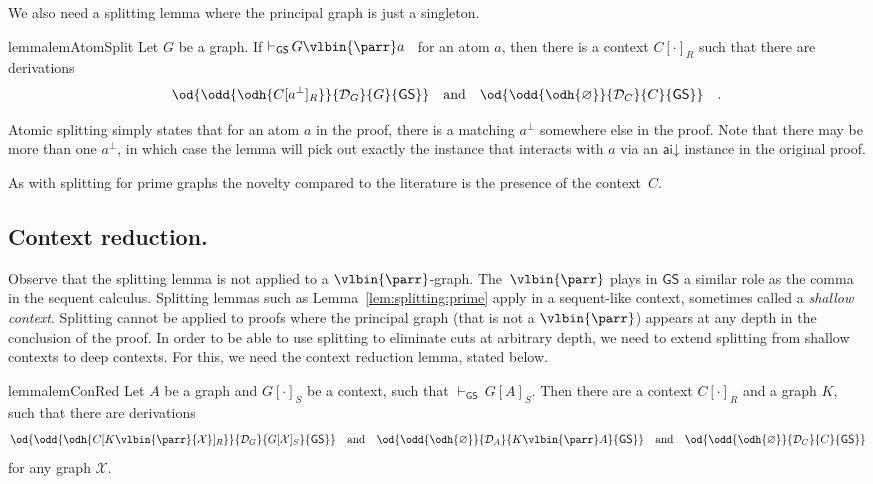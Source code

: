\documentclass{lmcs} %
\newcommand{\proves}[2][]{\mathord{\vdash_{#1}\,}{#2}}
\renewcommand{\emptyset}{\varnothing}
\def\unit{\emptyset}
\def\GS{\mathsf{GS}}
\newcommand{\coons}[2]{[#1]_{#2}}														%
\newcommand{\coonso}[1]{[\cdot]_{#1}}
\newcommand{\quand}{\quad\mbox{and}\quad}
\newcommand{\quadfs}{\rlap{\quad.}}
\def\aidr{\dairule}
\def\ods#1#2#3#4{\od{\odd{\odh{#1}}{#2}{#3}{#4}}}
\def\cneg#1{{#1^\bot}}
\def\lpar{\vlbin{\parr}}
\def\airule{\mathsf{ai}}
\def\dairule{\airule\mathord{\downarrow}}
\def\gA{A}
\def\gC{C}
\def\gG{G}
\def\gK{K}
\newcommand{\dD}{\mathcal{D}}
\theoremstyle{plain}
\begin{document}
We also need a splitting lemma where the principal graph is just a singleton.

\begin{restatable}{lemma}{lemAtomSplit}\label{lem:splitting:atom}
	Let $\gG$ be a graph.
	If\/ $\proves[\GS]{G\lpar a}$~ for an atom $a$, then there is a context $\gC\coonso R$ such that 
 there are derivations
	\begin{equation*}
		\ods{\gC\coons{\cneg a}R}{\dD_G}{\gG}{\GS}
		\quand
		\ods{\unit}{\dD_C}{\gC}{\GS}
		\quadfs
	\end{equation*}
\end{restatable}
Atomic splitting simply states that for an atom $a$ in the proof, there is a matching $\cneg{a}$ somewhere else in the proof. Note that there may be more than one $\cneg{a}$, in which case the lemma will pick out exactly the instance that interacts with $a$ via an $\aidr$ instance in the original proof.

As with splitting for prime graphs the novelty compared to the literature is the presence of the context~$C$.






\subsection*{Context reduction.}
Observe that the splitting lemma is not applied to a $\lpar$-graph. The~$\lpar$ plays in $\GS$ a similar role as the comma in the sequent calculus.
Splitting lemmas such as Lemma~\ref{lem:splitting:prime} apply in a sequent-like 
context, sometimes called a \textit{shallow context}. Splitting cannot be applied to proofs where the principal graph (that is not a $\lpar$) appears at any depth in the conclusion of the proof. In order to be able to use splitting to eliminate cuts at arbitrary depth, we need to extend splitting from shallow contexts to deep contexts. For this, we need the context reduction lemma, stated below.





\def\XXX{{\mathcal X}}
\def\YYY{{\mathcal Y}}
\begin{restatable}{lemma}{lemConRed}\label{lem:conred}
	Let $A$ be a graph and $\gG\coonso{S}$ be a context, such that\/
	$\proves[\GS]{\gG\coons{\gA}S}$. Then there are a
	context $\gC\coonso R$ and a graph $\gK$, such that there are derivations
	\begin{equation*}
		\ods{\gC\coons{\gK\lpar\XXX}R}{\dD_G}{\gG\coons{\XXX}S}{\GS}
		\quand
		\ods{\unit}{\dD_A}{\gK\lpar\gA}{\GS}
		\quand
		\ods{\unit}{\dD_C}{\gC}{\GS}
	\end{equation*}
	for any graph $\XXX$.
\end{restatable}
\end{document}
